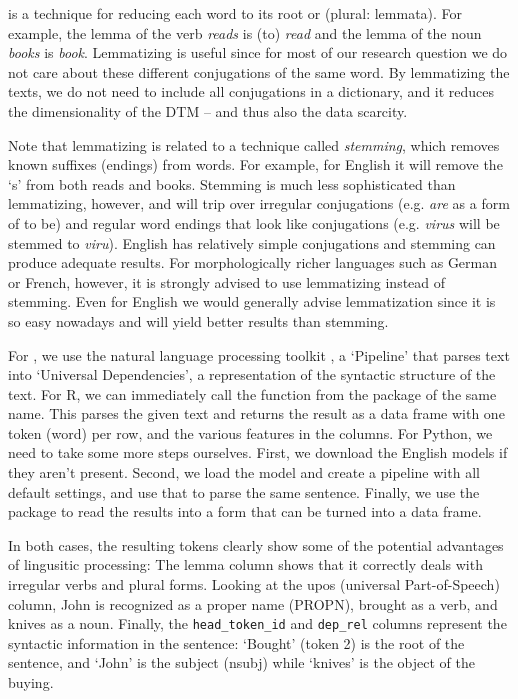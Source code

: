  is a technique for reducing each word to its root or  (plural: lemmata).
For example, the lemma of the verb \emph{reads} is (to) \emph{read} and the lemma of the noun \emph{books} is \emph{book}.
Lemmatizing is useful since for most of our research question we do not care about these different conjugations of the same word.
By lemmatizing the texts, we do not need to include all conjugations in a dictionary,
and it reduces the dimensionality of the DTM -- and thus also the data scarcity.

Note that lemmatizing is related to a technique called \emph{stemming}, which removes known suffixes (endings) from words.
For example, for English it will remove the `s' from both reads and books.
Stemming is much less sophisticated than lemmatizing, however, and will trip over irregular conjugations
(e.g. \emph{are} as a form of to be) and regular word endings that look like conjugations (e.g. \emph{virus} will be stemmed to \emph{viru}).
English has relatively simple conjugations and stemming can produce adequate results.
For morphologically richer languages such as German or French, however, it is strongly advised to use lemmatizing instead of stemming.
Even for English we would generally advise lemmatization since it is so easy nowadays and will yield better results than stemming.

For , we use the  natural language processing toolkit \citep{udpipe},
a `Pipeline' that parses text into `Universal Dependencies', a representation of the syntactic structure of the text.
For R, we can immediately call the  function from the package of the same name.
This parses the given text and returns the result as a data frame with one token (word) per row,
and the various features in the columns.
For Python, we need to take some more steps ourselves.
First, we download the English models if they aren't present.
Second, we load the model and create a pipeline with all default settings,
and use that to parse the same sentence.
Finally, we use the  package to read the results into a form that can be turned into a data frame.

In both cases, the resulting tokens clearly show some of the potential advantages of lingusitic processing:
The lemma column shows that it correctly deals with irregular verbs and plural forms.
Looking at the upos (universal Part-of-Speech) column, John is recognized as a proper name (PROPN), brought as a verb, and knives as a noun.
Finally, the \verb|head_token_id| and \verb|dep_rel| columns represent the syntactic information in the sentence:
`Bought' (token 2) is the root of the sentence, and `John' is the subject (nsubj) while `knives' is the object of the buying.

